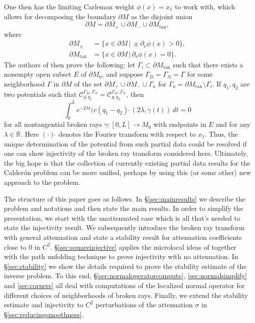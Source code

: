 \documentclass[10pt]{amsart}
\theoremstyle{definition}
\theoremstyle{definition}
\theoremstyle{definition}
\begin{document}
One then has the limiting Carleman weight $\phi(x) = x_{1}$ to work with, which allows for decomposing the boundary $\partial M$ as the disjoint union
\begin{equation*}
\partial M = \partial M_{+} \cup \partial M_{-} \cup \partial M_{\mathrm{tan}},
\end{equation*}
where
\begin{align*}
\partial M_{\pm} & = \{ x \in \partial M \, | \, \pm \partial_{\nu} \phi(x) > 0\},\\
\partial M_{\mathrm{tan}} & = \{x \in \partial M \, | \, \partial_{\nu}\phi(x) = 0 \}.
\end{align*}
The authors of \cite{salokenig} then prove the following: let $\Gamma_{i} \subset \partial M_{\mathrm{tan}}$ such that there exists a nonempty open subset $E$ of $\partial M_{0}$, and suppose $\Gamma_{D} = \Gamma_{N} = \Gamma$ for some neighborhood $\Gamma$ in $\partial M$ of the set $\overline{\partial M_{+} \cup \partial M_{-} \cup \Gamma_{a}}$ for $\Gamma_{a} = \partial M_{\mathrm{tan}} \setminus \Gamma_{i}$. If $q_{1},q_{2}$ are two potentials such that $\mathcal{C}_{g,q_{1}}^{\Gamma_{D},\Gamma_{N}} = \mathcal{C}_{g,q_{2}}^{\Gamma_{D},\Gamma_{N}}$, then
\begin{equation*}
\int_{0}^{L}e^{-2\lambda t}( c(q_{1} - q_{2})\,{\hat{}}\,(2\lambda, \gamma(t))\,dt = 0
\end{equation*}
for all nontangential broken rays $\gamma: [0,L] \to M_{0}$ with endpoints in $E$ and for any $\lambda \in \mathbb{R}$. Here $( \cdot )\,{\hat{}}$ denotes the Fourier transform with respect to $x_{1}$.
Thus, the unique determination of the potential from such partial data could be resolved if one can show injectivity of the broken ray transform considered here. Ultimately, the big hope is that the collection of currently existing partial data results for the Calder\'on problem can be more unified, perhaps by using this (or some other) new approach to the problem.

The structure of this paper goes as follows. In \S \ref{sec:mainresults} we describe the problem and notations and then state the main results. In order to simplify the presentation, we start with the unattenuated case which is all that's needed to state the injectivity result. We subsequently introduce the broken ray transform with general attenuation and state a stability result for attenuation coefficients close to $0$ in $C^{2}$. \S \ref{sec:squareinjective} applies the microlocal ideas of \cite{xraygeneric} together with the path unfolding technique to prove injectivity with no attenuation. In \S \ref{sec:stability} we show the details required to prove the stability estimate of the inverse problem. To this end, \S \ref{sec:normaloperatorcompute}, \ref{sec:normalsimplify} and \ref{sec:corners} all deal with computations of the localized normal operator for different choices of neighborhoods of broken rays. Finally, we extend the stability estimate and injectivity to $C^{2}$ perturbations of the attenuation $\sigma$ in \S \ref{sec:reducingsmoothness}.
\end{document}
